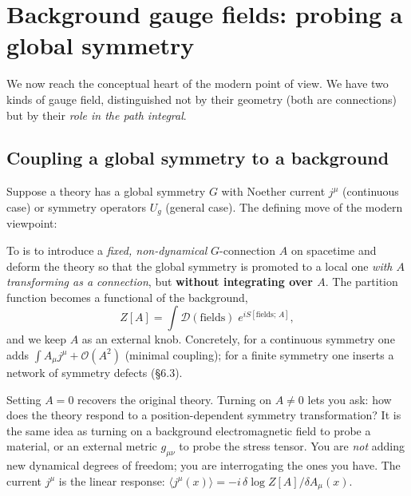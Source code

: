 \documentclass[11pt]{article}
\begin{document}
\section{Background gauge fields: probing a global symmetry}

We now reach the conceptual heart of the modern point of view. We have two kinds of
gauge field, distinguished not by their geometry (both are connections) but by their
\emph{role in the path integral}.

\subsection{Coupling a global symmetry to a background}

Suppose a theory has a global symmetry $G$ with Noether current $j^\mu$ (continuous
case) or symmetry operators $U_g$ (general case). The defining move of the modern
viewpoint:

\begin{ddefinition}
To  is to introduce a
\emph{fixed, non-dynamical} $G$-connection $A$ on spacetime and deform the theory so
that the global symmetry is promoted to a local one \emph{with $A$ transforming as a
connection}, but \textbf{without integrating over $A$}. The partition function becomes a
functional of the background,
\[
Z[A] = \int \mathcal{D}(\text{fields})\; e^{iS[\text{fields};\,A]},
\]
and we keep $A$ as an external knob. Concretely, for a continuous symmetry one adds
$\int A_\mu j^\mu + \mathcal O(A^2)$ (minimal coupling); for a finite symmetry one
inserts a network of symmetry defects (\S6.3).
\end{ddefinition}

\begin{iintuition}
Setting $A=0$ recovers the original theory. Turning on $A\neq 0$ lets you ask: how does
the theory respond to a position-dependent symmetry transformation? It is the same idea
as turning on a background electromagnetic field to probe a material, or an external
metric $g_{\mu\nu}$ to probe the stress tensor. You are \emph{not} adding new dynamical
degrees of freedom; you are interrogating the ones you have. The current $j^\mu$ is the
linear response: $\langle j^\mu(x)\rangle = -i\,\delta \log Z[A]/\delta A_\mu(x)$.
\end{iintuition}
\end{document}
